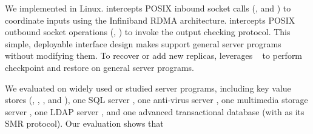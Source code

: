 


We implemented \xxx in Linux. \xxx intercepts POSIX inbound socket calls 
(\eg, \accept and \recv) to coordinate inputs using the Infiniband 
RDMA architecture. \xxx intercepts POSIX outbound socket operations (\eg, 
\send) to invoke the output checking protocol. This simple, deployable 
interface design makes \xxx support general server programs without modifying 
them. To recover or add new replicas, \xxx leverages \criu~\cite{criu} to 
perform checkpoint and restore on general server programs.

We evaluated \xxx on \nprog widely used or studied server programs, including 
\nkvprog key value stores (\redis, \memcached, \ssdb, and \mongodb), one SQL 
server \mysql, one anti-virus server \clamav, one multimedia storage server 
\mediatomb, one LDAP server \openldap, and one advanced transactional database 
\calvin (with \zookeeper as its SMR protocol). Our evaluation shows that

